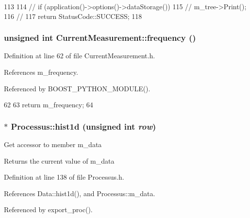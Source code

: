 \begin{DoxyCode}
113                                           {
114   // if (application()->options()->dataStorage()){
115   //   m_tree->Print();
116   // }
117   return StatusCode::SUCCESS;
118 }
\end{DoxyCode}
\hypertarget{classCurrentMeasurement_ae7c60d0b14808000df5f1d633e0ca990}{
\subsubsection[{frequency}]{\setlength{\rightskip}{0pt plus 5cm}unsigned int CurrentMeasurement::frequency ()}}
\label{classCurrentMeasurement_ae7c60d0b14808000df5f1d633e0ca990}


Definition at line 62 of file CurrentMeasurement.h.

References m\_\-frequency.

Referenced by BOOST\_\-PYTHON\_\-MODULE().


\begin{DoxyCode}
62                           {
63     return m_frequency;
64   }
\end{DoxyCode}
\hypertarget{classProcessus_a409227db936baff03c0462c1bcfe8069}{
\subsubsection[{hist1d}]{$\ast$ Processus::hist1d (unsigned int {\em row})}}
\label{classProcessus_a409227db936baff03c0462c1bcfe8069}
Get accessor to member m\_\-data \begin{DoxyReturn}{Returns}
the current value of m\_\-data 
\end{DoxyReturn}


Definition at line 138 of file Processus.h.

References Data::hist1d(), and Processus::m\_\-data.

Referenced by export\_\-proc().



